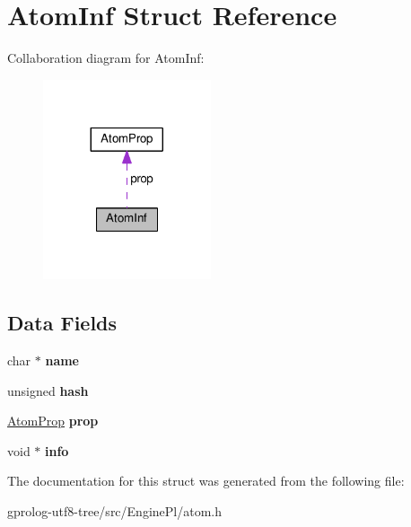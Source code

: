 \hypertarget{structAtomInf}{}\section{Atom\+Inf Struct Reference}
\label{structAtomInf}


Collaboration diagram for Atom\+Inf\+:\nopagebreak
\begin{figure}[H]
\begin{center}
\leavevmode
\includegraphics[width=140pt]{structAtomInf__coll__graph}
\end{center}
\end{figure}
\subsection*{Data Fields}
\begin{DoxyCompactItemize}
\item 
char $\ast$ {\bfseries name}\hypertarget{structAtomInf_a2e8fbcd0d525d43b562f771d099e694e}{}\label{structAtomInf_a2e8fbcd0d525d43b562f771d099e694e}

\item 
unsigned {\bfseries hash}\hypertarget{structAtomInf_aa2294890b36422410177f1ac258c5157}{}\label{structAtomInf_aa2294890b36422410177f1ac258c5157}

\item 
\hyperlink{structAtomProp}{Atom\+Prop} {\bfseries prop}\hypertarget{structAtomInf_a649620e4716f966372c391e2e8e5245d}{}\label{structAtomInf_a649620e4716f966372c391e2e8e5245d}

\item 
void $\ast$ {\bfseries info}\hypertarget{structAtomInf_a497dcae4cea5b3a779731b97476d05a5}{}\label{structAtomInf_a497dcae4cea5b3a779731b97476d05a5}

\end{DoxyCompactItemize}


The documentation for this struct was generated from the following file\+:\begin{DoxyCompactItemize}
\item 
gprolog-\/utf8-\/tree/src/\+Engine\+Pl/atom.\+h\end{DoxyCompactItemize}
